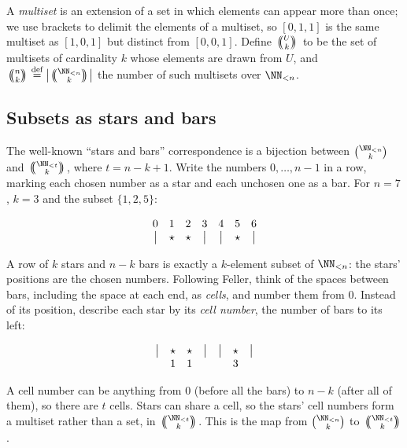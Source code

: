 \documentclass[letterpaper,11pt]{article}
\newcommand{\multichoose}[2]{
\left.\mathchoice
  {\left(\kern-0.48em\binom{#1}{#2}\kern-0.48em\right)}
  {\big(\kern-0.30em\binom{\smash{#1}}{\smash{#2}}\kern-0.30em\big)}
  {\left(\kern-0.30em\binom{\smash{#1}}{\smash{#2}}\kern-0.30em\right)}
  {\left(\kern-0.30em\binom{\smash{#1}}{\smash{#2}}\kern-0.30em\right)}
\right.}
\newcommand*{\defeq}{\stackrel{\text{def}}{=}}
\begin{document}
A \emph{multiset} is an extension of a set in which elements can
appear more than once; we use brackets to delimit the elements of a
multiset, so $[0, 1, 1]$ is the same multiset as $[1, 0, 1]$ but
distinct from $[0, 0, 1]$. Define \(\multichoose{U}{k}\) to be the set
of multisets of cardinality \(k\) whose elements are drawn from
\(U\), and \(\multichoose{n}{k} \defeq
\left|\multichoose{\NN_{<n}}{k}\right|\) the number of such multisets
over \(\NN_{<n}\).

\subsection{Subsets as stars and bars}\label{starsandbars}

The well-known ``stars and bars'' correspondence \cite[Chapter II
\S 5]{feller} is a bijection between \(\binom{\NN_{<n}}{k}\) and
\(\multichoose{\NN_{<t}}{k}\), where \(t = n - k + 1\). Write the
numbers \(0, \ldots, n-1\) in a row, marking each chosen number as a
star and each unchosen one as a bar. For \(n = 7\), \(k = 3\) and the
subset \(\{1, 2, 5\}\):

\begin{displaymath}
    \begin{array}{ c c c c c c c }
        0 & 1 & 2 & 3 & 4 & 5 & 6 \\
        \big| & \star & \star & \big| & \big| & \star & \big| \\
    \end{array}
\end{displaymath}

A row of \(k\) stars and \(n - k\) bars is exactly a \(k\)-element
subset of \(\NN_{<n}\): the stars' positions are the chosen numbers.
Following Feller, think of the spaces between bars, including the
space at each end, as \emph{cells}, and number them from \(0\).
Instead of its position, describe each star by its \emph{cell number},
the number of bars to its left:

\begin{displaymath}
    \begin{array}{ c c c c c c c }
        \big| & \star & \star & \big| & \big| & \star & \big| \\
          & 1 & 1 & & & 3 & \\
    \end{array}
\end{displaymath}

A cell number can be anything from \(0\) (before all the bars) to
\(n - k\) (after all of them), so there are \(t\) cells.
Stars can share a cell, so the stars' cell numbers form a multiset
rather than a set, in \(\multichoose{\NN_{<t}}{k}\). This is the map
from \(\binom{\NN_{<n}}{k}\) to \(\multichoose{\NN_{<t}}{k}\).
\end{document}
